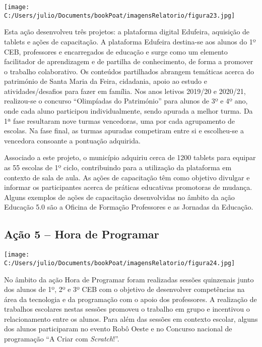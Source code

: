\documentclass[
]{book}
\begin{document}
\texttt{[image: C:/Users/julio/Documents/bookPoat/imagensRelatorio/figura23.jpg]}

Esta ação desenvolveu três projetos: a plataforma digital Edufeira, aquisição de tablets e ações de capacitação. A plataforma Edufeira destina-se aos alunos do 1º CEB, professores e encarregados de educação e surge como um elemento facilitador de aprendizagem e de partilha de conhecimento, de forma a promover o trabalho colaborativo. Os conteúdos partilhados abrangem temáticas acerca do património de Santa Maria da Feira, cidadania, apoio ao estudo e atividades/desafios para fazer em família. Nos anos letivos 2019/20 e 2020/21, realizou-se o concurso ``Olimpíadas do Património'' para alunos de 3º e 4º ano, onde cada aluno participou individualmente, sendo apurada a melhor turma. Da 1ª fase resultaram nove turmas vencedoras, uma por cada agrupamento de escolas. Na fase final, as turmas apuradas competiram entre si e escolheu-se a vencedora consoante a pontuação adquirida.

Associado a este projeto, o município adquiriu cerca de 1200 tablets para equipar as 55 escolas de 1º ciclo, contribuindo para a utilização da plataforma em contexto de sala de aula. As ações de capacitação têm como objetivo divulgar e informar os participantes acerca de práticas educativas promotoras de mudança. Alguns exemplos de ações de capacitação desenvolvidas no âmbito da ação Educação 5.0 são a Oficina de Formação Professores e as Jornadas da Educação.

\hypertarget{auxe7uxe3o-5-hora-de-programar}{%
\subsection{\texorpdfstring{\textbf{Ação 5 -- Hora de Programar}}{Ação 5 -- Hora de Programar}}\label{auxe7uxe3o-5-hora-de-programar}}

\texttt{[image: C:/Users/julio/Documents/bookPoat/imagensRelatorio/figura24.jpg]}

No âmbito da ação Hora de Programar foram realizadas sessões quinzenais junto dos alunos de 1º, 2º e 3º CEB com o objetivo de desenvolver competências na área da tecnologia e da programação com o apoio dos professores. A realização de trabalhos escolares nestas sessões promoveu o trabalho em grupo e incentivou o relacionamento entre os alunos. Para além das sessões em contexto escolar, alguns dos alunos participaram no evento Robô Oeste e no Concurso nacional de programação ``A Criar com \emph{Scratch}!''.
\end{document}
